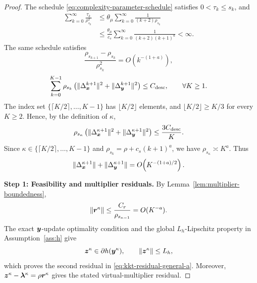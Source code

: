 \begin{proof}
The schedule \eqref{eq:complexity-parameter-schedule} satisfies
$0<\tau_k\le s_k$, and
\[
\begin{aligned}
    \sum_{k=0}^{\infty}\frac{\tau_k}{\rho_{s_k}^2}
    &\le
    \theta_\mu
    \sum_{k=0}^{\infty}
    \frac{1}{(k+2)\rho_{s_k}}\\
    &\le
    \frac{\theta_\mu}{c_s}
    \sum_{k=0}^{\infty}
    \frac{1}{(k+2)(k+1)^a}
    <\infty.
\end{aligned}
\]
The same schedule satisfies
\[
    \frac{\rho_{s_{k+1}}-\rho_{s_k}}{\rho_{s_k}^2}
    =O(k^{-(1+a)}),
\]
\[
    \sum_{k=0}^{K-1}
    \rho_{s_k}\left(\|\Delta_{\bm{x}}^{k+1}\|^2+\|\Delta_{\bm{y}}^{k+1}\|^2\right)
    \le
    C_{\mathrm{desc}},
    \qquad
    \forall K\ge1.
\]
The index set $\{\lceil K/2\rceil,\ldots,K-1\}$ has
$\lfloor K/2\rfloor$ elements, and $\lfloor K/2\rfloor\ge K/3$ for every
$K\ge2$.  Hence, by the definition of $\kappa$,
\[
    \rho_{s_\kappa}\left(\|\Delta_{\bm{x}}^{\kappa+1}\|^2+\|\Delta_{\bm{y}}^{\kappa+1}\|^2\right)
    \le
    \frac{3C_{\mathrm{desc}}}{K}.
\]
Since $\kappa\in\{\lceil K/2\rceil,\ldots,K-1\}$ and
$\rho_{s_k}=\rho+c_s(k+1)^a$, we have $\rho_{s_\kappa}\asymp K^a$.  Thus
\[
    \|\Delta_{\bm{x}}^{\kappa+1}\|+\|\Delta_{\bm{y}}^{\kappa+1}\|
    =
    O\!\left(K^{-(1+a)/2}\right).
\]

\textbf{Step 1: Feasibility and multiplier residuals.}
By Lemma~\ref{lem:multiplier-boundedness},
\[
    \|\bm{r}^\kappa\|
    \le
    \frac{C_r}{\rho_{s_{\kappa-1}}}
    =
    O(K^{-a}).
\]
The exact $\bm{y}$-update optimality condition and the global
$L_h$-Lipschitz property in Assumption~\ref{ass:h} give
\[
    \bm{z}^\kappa\in\partial h(\bm{y}^\kappa),
    \qquad
    \|\bm{z}^\kappa\|\le L_h,
\]
which proves the second residual in
\eqref{eq:kkt-residual-general-a}.  Moreover,
$\bm{z}^\kappa-\bm{\lambda}^\kappa=\rho\bm{r}^\kappa$ gives the stated virtual-multiplier
residual.


\end{proof}
